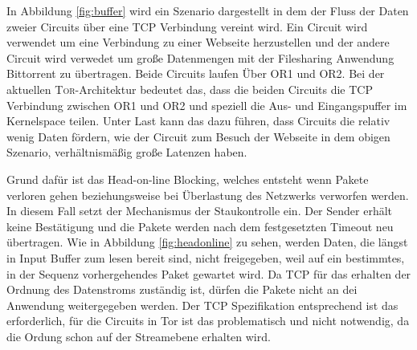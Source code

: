 \documentclass[fleqn,envcountsame,runningheads,10pt,a4paper]{llncs}
\begin{document}
\begin{figure}[h]
\end{figure} 

In Abbildung \ref{fig:buffer} wird ein Szenario dargestellt in dem der Fluss der Daten zweier Circuits über eine TCP Verbindung vereint wird. Ein Circuit wird verwendet um eine Verbindung zu einer Webseite herzustellen und der andere Circuit wird verwedet um große Datenmengen mit der Filesharing Anwendung Bittorrent zu übertragen. Beide Circuits laufen Über OR1 und OR2. Bei der aktuellen \textsc{Tor}-Architektur bedeutet das, dass die beiden Circuits die TCP Verbindung zwischen OR1 und OR2 und speziell die Aus- und Eingangspuffer im Kernelspace teilen. Unter Last kann das dazu führen, dass Circuits die relativ wenig Daten fördern, wie der Circuit zum Besuch der Webseite in dem obigen Szenario, verhältnismäßig große Latenzen haben.


\newpage Grund dafür ist das Head-on-line Blocking, welches entsteht wenn Pakete verloren gehen beziehungsweise bei Überlastung des Netzwerks verworfen werden. In diesem Fall setzt der Mechanismus der Staukontrolle ein. Der Sender erhält keine Bestätigung und die Pakete werden nach dem festgesetzten Timeout neu übertragen. Wie in Abbildung \ref{fig:headonline} zu sehen, werden Daten, die längst in Input Buffer zum lesen bereit sind, nicht freigegeben, weil auf ein bestimmtes, in der Sequenz vorhergehendes Paket gewartet wird. Da TCP für das erhalten der Ordnung des Datenstroms zuständig ist, dürfen die Pakete nicht an dei Anwendung weitergegeben werden. Der TCP Spezifikation entsprechend ist das erforderlich, für die Circuits in Tor ist das problematisch und nicht notwendig, da die Ordung schon auf der Streamebene erhalten wird.

\begin{figure}[h]
\end{figure}
\end{document}
